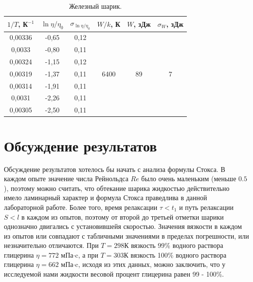 \documentclass[a4paper,12pt]{article} %
\begin{document}
	\begin{table}[H]
		\caption{Железный шарик.}
		\label{table:Fe_W}
\begin{tabular}{|c|c|c|c|c|c|}
\hline
$1/T$, К$^{-1}$ & $\ln{\eta/\eta_0}$ & $\sigma_{\ln{\eta/\eta_0}}$ & $W/k$, К              & $W$, зДж            & $\sigma_W$, зДж    \\ \hline
0,00336         & -0,65              & 0,12                        & \multirow{7}{*}{6400} & \multirow{7}{*}{89} & \multirow{7}{*}{7} \\ \cline{1-3}
0,0033          & -0,80              & 0,11                        &                       &                     &                    \\ \cline{1-3}
0,00324         & -1,15              & 0,12                        &                       &                     &                    \\ \cline{1-3}
0,00319         & -1,37              & 0,11                        &                       &                     &                    \\ \cline{1-3}
0,00314         & -1,91              & 0,11                        &                       &                     &                    \\ \cline{1-3}
0,0031          & -2,26              & 0,11                        &                       &                     &                    \\ \cline{1-3}
0,00305         & -2,50              & 0,11                        &                       &                     &                    \\ \hline
\end{tabular}
	\end{table}

\newpage	
\section{Обсуждение результатов}	
	Обсуждение результатов хотелось бы начать с анализа формулы Стокса. В каждом опыте значение числа Рейнольдса $Re$ было очень маленьким (меньше $0.5$), поэтому можно считать, что обтекание шарика жидкостью действительно имело ламинарный характер и формула Стокса праведлива в данной лабораторной работе. Более того, время релаксации $\tau < t_1$ и путь релаксации $S < l$ в каждом из опытов, поэтому от второй до третьей отметки шарики однозначно двигались с установившейя скоростью. Значения вязкости в каждом из опытов или совпадают с табличными значениями в пределах погрешности, или незначительно отличаются. При $T = 298$К вязкость 99\% водного раствора глицерина $\eta = 772$ мПа$\cdot$c, а при $T = 303$К вязкость 100\% водного раствора глицерина $\eta = 662$ мПа$\cdot$c, исходя из этих данных, можно заключить, что у исследуемой нами жидкости весовой процент глицерина равен 99 - 100\%.
	
\end{document}
